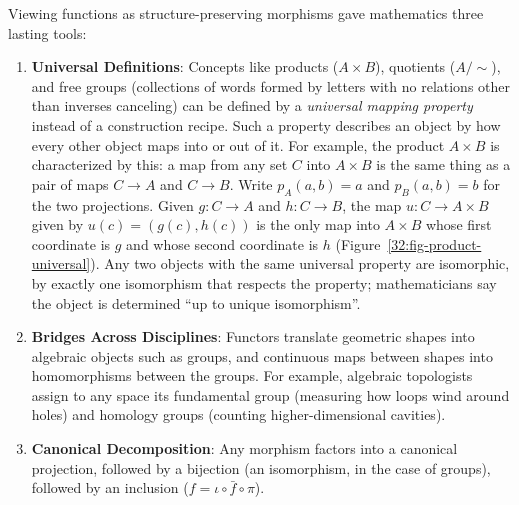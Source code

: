 Viewing functions as structure-preserving morphisms gave mathematics three lasting tools:
\begin{enumerate}
  \item \textbf{Universal Definitions}: Concepts like products ($A \times B$), quotients ($A/{\sim}$), and free groups (collections of words formed by letters with no relations other than inverses canceling) can be defined by a \emph{universal mapping property} instead of a construction recipe. Such a property describes an object by how every other object maps into or out of it. For example, the product $A \times B$ is characterized by this: a map from any set $C$ into $A \times B$ is the same thing as a pair of maps $C \to A$ and $C \to B$. Write $p_A(a, b) = a$ and $p_B(a, b) = b$ for the two projections. Given $g: C \to A$ and $h: C \to B$, the map $u: C \to A \times B$ given by $u(c) = (g(c), h(c))$ is the only map into $A \times B$ whose first coordinate is $g$ and whose second coordinate is $h$ (Figure~\ref{32:fig-product-universal}). Any two objects with the same universal property are isomorphic, by exactly one isomorphism that respects the property; mathematicians say the object is determined ``up to unique isomorphism''.
  \item \textbf{Bridges Across Disciplines}: Functors translate geometric shapes into algebraic objects such as groups, and continuous maps between shapes into homomorphisms between the groups. For example, algebraic topologists assign to any space its fundamental group (measuring how loops wind around holes) and homology groups (counting higher-dimensional cavities).
  \item \textbf{Canonical Decomposition}: Any morphism factors into a canonical projection, followed by a bijection (an isomorphism, in the case of groups), followed by an inclusion ($f = \iota \circ \bar{f} \circ \pi$).
\end{enumerate}

